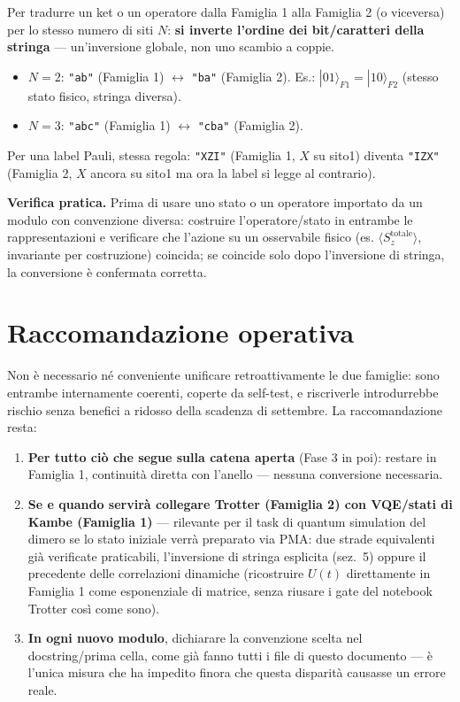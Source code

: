 \documentclass[11pt,a4paper]{article}
\begin{document}
Per tradurre un ket o un operatore dalla Famiglia 1 alla Famiglia 2 (o
viceversa) per lo stesso numero di siti $N$: \textbf{si inverte l'ordine
dei bit/caratteri della stringa} — un'inversione globale, non uno scambio
a coppie.

\begin{itemize}
\item $N=2$: \texttt{"ab"} (Famiglia 1) $\leftrightarrow$ \texttt{"ba"}
(Famiglia 2). Es.: $|01\rangle_{F1} = |10\rangle_{F2}$ (stesso stato
fisico, stringa diversa).
\item $N=3$: \texttt{"abc"} (Famiglia 1) $\leftrightarrow$ \texttt{"cba"}
(Famiglia 2).
\end{itemize}

Per una label Pauli, stessa regola: \texttt{"XZI"} (Famiglia 1, $X$ su
sito1) diventa \texttt{"IZX"} (Famiglia 2, $X$ ancora su sito1 ma ora la
label si legge al contrario).

\textbf{Verifica pratica.} Prima di usare uno stato o un operatore
importato da un modulo con convenzione diversa: costruire
l'operatore/stato in entrambe le rappresentazioni e verificare che
l'azione su un osservabile fisico (es. $\langle S_z^{\text{totale}}\rangle$,
invariante per costruzione) coincida; se coincide solo dopo l'inversione
di stringa, la conversione è confermata corretta.

\section{Raccomandazione operativa}

Non è necessario né conveniente unificare retroattivamente le due
famiglie: sono entrambe internamente coerenti, coperte da self-test, e
riscriverle introdurrebbe rischio senza benefici a ridosso della scadenza
di settembre. La raccomandazione resta:

\begin{enumerate}
\item \textbf{Per tutto ciò che segue sulla catena aperta} (Fase 3 in
poi): restare in Famiglia 1, continuità diretta con l'anello — nessuna
conversione necessaria.
\item \textbf{Se e quando servirà collegare Trotter (Famiglia 2) con
VQE/stati di Kambe (Famiglia 1)} — rilevante per il task di quantum
simulation del dimero se lo stato iniziale verrà preparato via PMA: due
strade equivalenti già verificate praticabili, l'inversione di stringa
esplicita (sez.~5) oppure il precedente delle correlazioni dinamiche
(ricostruire $U(t)$ direttamente in Famiglia 1 come esponenziale di
matrice, senza riusare i gate del notebook Trotter così come sono).
\item \textbf{In ogni nuovo modulo}, dichiarare la convenzione scelta nel
docstring/prima cella, come già fanno tutti i file di questo documento —
è l'unica misura che ha impedito finora che questa disparità causasse un
errore reale.
\end{enumerate}
\end{document}
